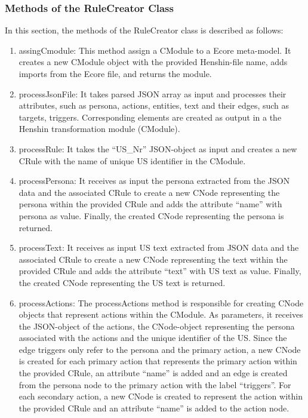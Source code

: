\subsubsection*{Methods of the RuleCreator Class}
In this section, the methods of the RuleCreator class is described as follows:
\begin{enumerate}
	
	\item assingCmodule: This method assign a CModule to a Ecore meta-model. It creates a new CModule object with the provided Henshin-file name, adds imports from the Ecore file, and returns the module.
	
	\item processJsonFile: It takes parsed JSON array as input and processes their attributes, such as persona, actions, entities, text and their edges, such as targets, triggers. Corresponding elements are created as output in a the Henshin transformation module (CModule).
	
	\item processRule: It takes the \enquote{US\_Nr} JSON-object as input and creates a new CRule with the name of unique US identifier in the CModule.
	
	\item processPersona: It receives as input the persona extracted from the JSON data and the associated CRule to create a new CNode representing the persona within the provided CRule and adds the attribute \enquote{name} with persona as value. Finally, the created CNode representing the persona is returned.
	
	\item processText: It receives as input US text extracted from JSON data and the associated CRule to create a new CNode representing the text within the provided CRule and adds the attribute \enquote{text} with US text as value. Finally, the created CNode representing the US text is returned.
	
	\item processActions: The processActions method is responsible for creating CNode objects that represent actions within the CModule. As parameters, it receives the JSON-object of the actions, the CNode-object representing the persona associated with the actions and the unique identifier of the US. Since the edge triggers only refer to the persona and the primary action, a new CNode is created for each primary action that represents the primary action within the provided CRule, an attribute \enquote{name} is added and an edge is created from the persona node to the primary action with the label \enquote{triggers}. For each secondary action, a new CNode is created to represent the action within the provided CRule and an attribute \enquote{name} is added to the action node.
	

\end{enumerate}
